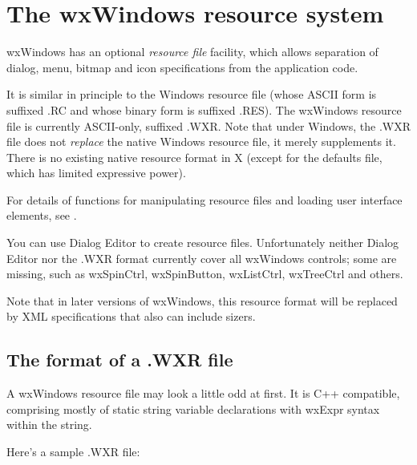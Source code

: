 \section{The wxWindows resource system}\label{resourceformats}

wxWindows has an optional {\it resource file} facility,
which allows separation of dialog, menu, bitmap and icon specifications
from the application code.

It is similar in principle to the Windows resource file (whose ASCII form is
suffixed .RC and whose binary form is suffixed .RES). The wxWindows resource
file is currently ASCII-only, suffixed .WXR. Note that under Windows,
the .WXR file does not {\it replace} the native Windows resource file,
it merely supplements it. There is no existing native resource format in X
(except for the defaults file, which has limited expressive power).

For details of functions for manipulating resource files and loading
user interface elements, see .

You can use Dialog Editor to create resource files. Unfortunately neither
Dialog Editor nor the .WXR format currently cover all wxWindows controls;
some are missing, such as wxSpinCtrl, wxSpinButton, wxListCtrl, wxTreeCtrl and others.

Note that in later versions of wxWindows, this resource format will be replaced
by XML specifications that also can include sizers.

\subsection{The format of a .WXR file}

A wxWindows resource file may look a little odd at first. It is C++
compatible, comprising mostly of static string variable declarations with
wxExpr syntax within the string.

Here's a sample .WXR file:

